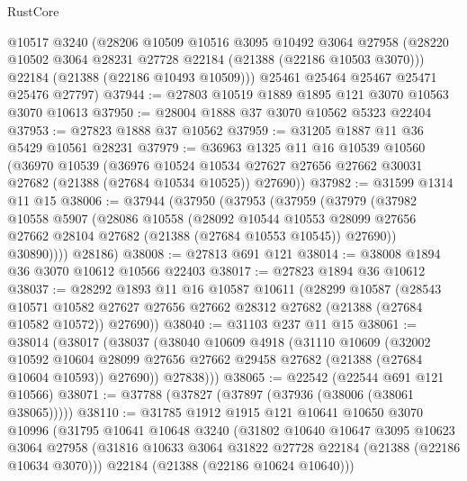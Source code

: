 \begin{lexlean}{RustCore}
\begin{coremodule}
      @10517
      @3240
      (@28206
        @10509
        @10516
        @3095
        @10492
        @3064
        @27958
        (@28220 @10502 @3064 @28231 @27728 @22184 (@21388 (@22186 @10503 @3070)))
        @22184
        (@21388 (@22186 @10493 @10509)))
      @25461
      @25464
      @25467
      @25471
      @25476
      @27797)
@37944 := @27803 @10519 @1889 @1895 @121 @3070 @10563 @3070 @10613
@37950 := @28004 @1888 @37 @3070 @10562 @5323 @22404
@37953 := @27823 @1888 @37 @10562
@37959 := @31205 @1887 @11 @36 @5429 @10561 @28231
@37979 := @36963
    @1325
    @11
    @16
    @10539
    @10560
    (@36970
      @10539
      (@36976
        @10524
        @10534
        @27627
        @27656
        @27662
        @30031
        @27682
        (@21388 (@27684 @10534 @10525))
        @27690))
@37982 := @31599 @1314 @11 @15
@38006 := @37944
    (@37950
      (@37953
        (@37959
          (@37979
            (@37982
              @10558
              @5907
              (@28086
                @10558
                (@28092
                  @10544
                  @10553
                  @28099
                  @27656
                  @27662
                  @28104
                  @27682
                  (@21388 (@27684 @10553 @10545))
                  @27690))
              @30890))))
      @28186)
@38008 := @27813 @691 @121
@38014 := @38008 @1894 @36 @3070 @10612 @10566 @22403
@38017 := @27823 @1894 @36 @10612
@38037 := @28292
    @1893
    @11
    @16
    @10587
    @10611
    (@28299
      @10587
      (@28543
        @10571
        @10582
        @27627
        @27656
        @27662
        @28312
        @27682
        (@21388 (@27684 @10582 @10572))
        @27690))
@38040 := @31103 @237 @11 @15
@38061 := @38014
    (@38017
      (@38037
        (@38040
          @10609
          @4918
          (@31110
            @10609
            (@32002
              @10592
              @10604
              @28099
              @27656
              @27662
              @29458
              @27682
              (@21388 (@27684 @10604 @10593))
              @27690))
          @27838)))
@38065 := @22542 (@22544 @691 @121 @10566)
@38071 := @37788 (@37827 (@37897 (@37936 (@38006 (@38061 @38065)))))
@38110 := @31785
    @1912
    @1915
    @121
    @10641
    @10650
    @3070
    @10996
    (@31795
      @10641
      @10648
      @3240
      (@31802
        @10640
        @10647
        @3095
        @10623
        @3064
        @27958
        (@31816 @10633 @3064 @31822 @27728 @22184 (@21388 (@22186 @10634 @3070)))
        @22184
        (@21388 (@22186 @10624 @10640)))

\end{coremodule}
\end{lexlean}
